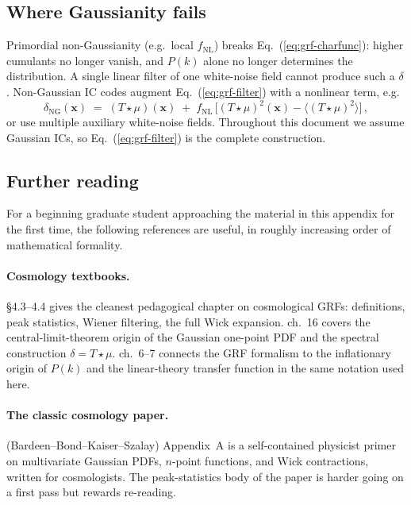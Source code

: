 \documentclass[12pt]{article}
\newcommand{\bx}{\mathbf{x}}
\begin{document}
\subsection{Where Gaussianity fails}

Primordial non-Gaussianity (e.g.\ local $f_\mathrm{NL}$) breaks
Eq.~(\ref{eq:grf-charfunc}): higher cumulants no longer vanish, and
$P(k)$ alone no longer determines the distribution.  A single linear
filter of one white-noise field cannot produce such a $\delta$.
Non-Gaussian IC codes augment Eq.~(\ref{eq:grf-filter}) with a
nonlinear term, e.g.
\begin{equation}
  \delta_\mathrm{NG}(\bx) \;=\; (T \star \mu)(\bx)
        \;+\; f_\mathrm{NL}\,\bigl[(T\star\mu)^2(\bx)
                                   - \langle (T\star\mu)^2\rangle\bigr]\,,
  \label{eq:fnl-local}
\end{equation}
or use multiple auxiliary white-noise fields.  Throughout this
document we assume Gaussian ICs, so Eq.~(\ref{eq:grf-filter}) is
the complete construction.

\subsection{Further reading}
\label{sec:grf-further}

For a beginning graduate student approaching the material in this
appendix for the first time, the following references are useful,
in roughly increasing order of mathematical formality.

\paragraph{Cosmology textbooks.}
\citet{MoBoschWhite2010} \S4.3--4.4 gives the cleanest pedagogical
chapter on cosmological GRFs: definitions, peak statistics, Wiener
filtering, the full Wick expansion.  \citet{Peacock1999} ch.~16
covers the central-limit-theorem origin of the Gaussian one-point
PDF and the spectral construction $\delta = T \star \mu$.
\citet{DodelsonSchmidt2020} ch.~6--7 connects the GRF formalism to
the inflationary origin of $P(k)$ and the linear-theory transfer
function in the same notation used here.

\paragraph{The classic cosmology paper.}
\citet{BBKS1986} (Bardeen--Bond--Kaiser--Szalay) Appendix~A is a
self-contained physicist primer on multivariate Gaussian PDFs,
$n$-point functions, and Wick contractions, written for cosmologists.
The peak-statistics body of the paper is harder going on a first
pass but rewards re-reading.
\end{document}
